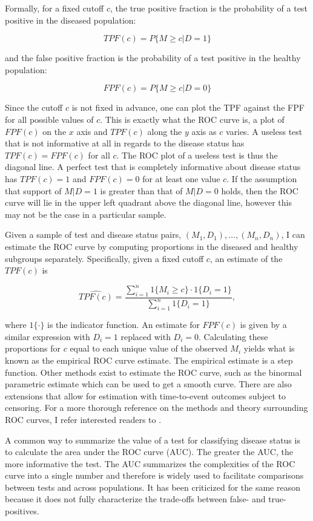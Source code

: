 \documentclass[codesnippet]{jss}
\begin{document}
Formally, for a fixed cutoff \(c\), the true positive fraction is the
probability of a test positive in the diseased population:

\[ TPF(c) = P\{ M \geq c | D = 1 \} \]

and the false positive fraction is the probability of a test positive in
the healthy population:

\[ FPF(c) = P\{ M \geq c | D = 0 \} \]

Since the cutoff \(c\) is not fixed in advance, one can plot the TPF
against the FPF for all possible values of \(c\). This is exactly what
the ROC curve is, a plot of \(FPF(c)\) on the \(x\) axis and \(TPF(c)\)
along the \(y\) axis as \(c\) varies. A useless test that is not
informative at all in regards to the disease status has
\(TPF(c) = FPF(c)\) for all \(c\). The ROC plot of a useless test is
thus the diagonal line. A perfect test that is completely informative
about disease status has \(TPF(c) = 1\) and \(FPF(c) = 0\) for at least
one value \(c\). If the assumption that support of \(M | D = 1\) is
greater than that of \(M | D = 0\) holds, then the ROC curve will lie in
the upper left quadrant above the diagonal line, however this may not be
the case in a particular sample.

Given a sample of test and disease status pairs,
\((M_1, D_1), \ldots, (M_n, D_n)\), I can estimate the ROC curve by
computing proportions in the diseased and healthy subgroups separately.
Specifically, given a fixed cutoff \(c\), an estimate of the \(TPF(c)\)
is

\[ \widehat{TPF(c)} = \frac{\sum_{i = 1}^n 1\{M_i \geq c\} \cdot 1\{D_i = 1\}}{\sum_{i=1}^n 1\{D_i = 1\}}, \]

where \(1\{\cdot\}\) is the indicator function. An estimate for
\(FPF(c)\) is given by a similar expression with \(D_i = 1\) replaced
with \(D_i = 0\). Calculating these proportions for \(c\) equal to each
unique value of the observed \(M_i\) yields what is known as the
empirical ROC curve estimate. The empirical estimate is a step function.
Other methods exist to estimate the ROC curve, such as the binormal
parametric estimate which can be used to get a smooth curve. There are
also extensions that allow for estimation with time-to-event outcomes
subject to censoring. For a more thorough reference on the methods and
theory surrounding ROC curves, I refer interested readers to
\citet{pepe2003statistical}.

A common way to summarize the value of a test for classifying disease
status is to calculate the area under the ROC curve (AUC). The greater
the AUC, the more informative the test. The AUC summarizes the
complexities of the ROC curve into a single number and therefore is
widely used to facilitate comparisons between tests and across
populations. It has been criticized for the same reason because it does
not fully characterize the trade-offs between false- and true-positives.
\end{document}
